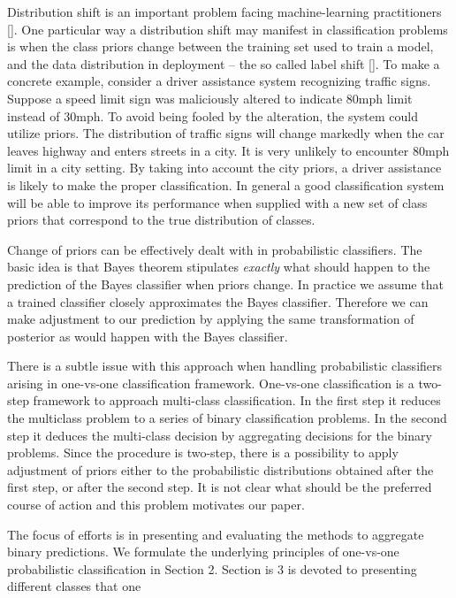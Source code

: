 \documentclass[twoside,11pt]{article}
\begin{document}
Distribution shift is an important problem facing machine-learning practitioners  [\cite{zhang2023dive, sugiyama2007covariate}].  One particular way a distribution shift may manifest in classification problems  is when the class priors change between the training set used to train a model, and the data distribution in deployment -- the so called label shift [\cite{vsipka2022hitchhiker,lipton2018detecting}]. To make a concrete example, consider a driver assistance system recognizing traffic signs. Suppose a speed limit sign was maliciously altered to indicate 80mph limit instead of 30mph. To avoid being fooled by the alteration, the system could utilize priors. The distribution of traffic signs will change markedly when the car leaves highway and enters streets in a city. It is very unlikely to encounter 80mph limit in a city setting. By taking into account the city priors, a driver assistance is likely to make the proper classification. In general a good classification system will be able to improve its performance when supplied with a new set of class priors that correspond to the true distribution of classes. 

Change of priors can be effectively dealt with in probabilistic classifiers. The basic idea is that Bayes theorem stipulates \emph{exactly} what should happen  to the prediction of the  Bayes classifier when priors change.  In practice we assume that a trained classifier closely approximates the Bayes classifier. Therefore we can make adjustment to our prediction by applying the same transformation of posterior as would happen with the Bayes classifier. 

There is a subtle issue with this approach  when handling probabilistic classifiers arising in one-vs-one classification framework.   One-vs-one classification is a two-step framework to approach  multi-class classification. In the first step it reduces the multiclass problem to a series of binary classification problems. In the second step it deduces the multi-class decision by aggregating decisions for the binary problems. Since the procedure is two-step, there is a possibility to apply adjustment of priors either to the probabilistic distributions obtained after the first step, or after the second step. It is not clear what should be the preferred course of action and this problem motivates our paper.

The focus of efforts is in presenting and evaluating the methods to aggregate binary predictions. We formulate the underlying principles of one-vs-one probabilistic classification in Section 2. Section is 3 is devoted to presenting different classes that one 
\end{document}
